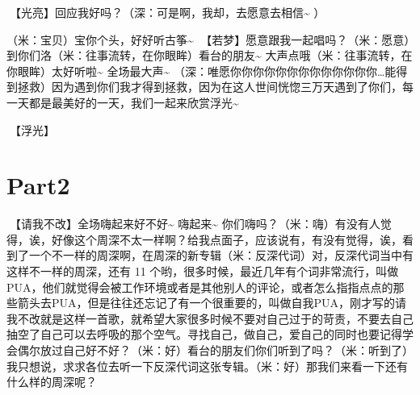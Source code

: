 \documentclass[
]{book}
\begin{document}
🎵【光亮】回应我好吗？（深：可是啊，我却，去愿意去相信\textasciitilde{} ）

（米：宝贝）宝你个头，好好听古筝\textasciitilde{}
🎵【若梦】愿意跟我一起唱吗？（米：愿意）到你们洛（米：往事流转，在你眼眸）看台的朋友\textasciitilde{} 大声点哦（米：往事流转，在你眼眸）太好听啦\textasciitilde{} 全场最大声\textasciitilde{} （深：唯愿你你你你你你你你你你你你你\ldots 能得到拯救）因为遇到你们我才得到拯救，因为在这人世间恍惚三万天遇到了你们，每一天都是最美好的一天，我们一起来欣赏浮光\textasciitilde{}

🎵【浮光】

\section{Part2}\label{chongqing-20241007-part2}

🎵【请我不改】全场嗨起来好不好\textasciitilde{} 嗨起来\textasciitilde{}
你们嗨吗？（米：嗨）有没有人觉得，诶，好像这个周深不太一样啊？给我点面子，应该说有，有没有觉得，诶，看到了一个不一样的周深啊，在周深的新专辑（米：反深代词）对，反深代词当中有这样不一样的周深，还有 11 个哟，很多时候，最近几年有个词非常流行，叫做PUA，他们就觉得会被工作环境或者是其他别人的评论，或者怎么指指点点的那些箭头去PUA，但是往往还忘记了有一个很重要的，叫做自我PUA，刚才写的请我不改就是这样一首歌，就希望大家很多时候不要对自己过于的苛责，不要去自己抽空了自己可以去呼吸的那个空气。寻找自己，做自己，爱自己的同时也要记得学会偶尔放过自己好不好？（米：好）看台的朋友们你们听到了吗？（米：听到了）我只想说，求求各位去听一下反深代词这张专辑。（米：好）那我们来看一下还有什么样的周深呢？
\end{document}
